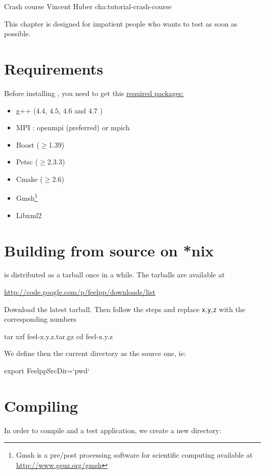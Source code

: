             {Crash course}
            {Vincent Huber}
            {cha:tutorial-crash-course}

This chapter is designed for impatient people who wants to test \feel as soon as possible.
\section{Requirements}
Before installing \feel, you need to get this \underline{required packages:}\\
\begin{itemize}
\item g++ ($4.4$, $4.5$, $4.6$ and $4.7$  )
\item MPI : openmpi (preferred) or mpich
\item Boost ($\geq$1.39)
\item Petsc ($\geq$2.3.3)
\item Cmake ($\geq$2.6)
\item Gmsh\footnote{Gmsh is a pre/post processing software for scientific
computing available at \url{http://www.geuz.org/gmsh}}
\item Libxml2
\end{itemize}

\section{Building \feel from source on *nix}
\feel is distributed as a tarball once in a while. The tarballs are available
at
\begin{center}
  \href{http://code.google.com/p/feelpp/downloads/list}{http://code.google.com/p/feelpp/downloads/list}
\end{center}
Download the latest tarball. Then follow the steps and replace
\texttt{x},\texttt{y},\texttt{z} with the corresponding numbers

\begin{unixcom}
  tar xzf feel-x.y.z.tar.gz
  cd feel-x.y.z
\end{unixcom}
We define then the current directory as the source one, ie:
\begin{unixcom}
  export FeelppSrcDir=`pwd`
\end{unixcom}

\section{Compiling}
In order to compile \feel and a test application, we create a new directory:

